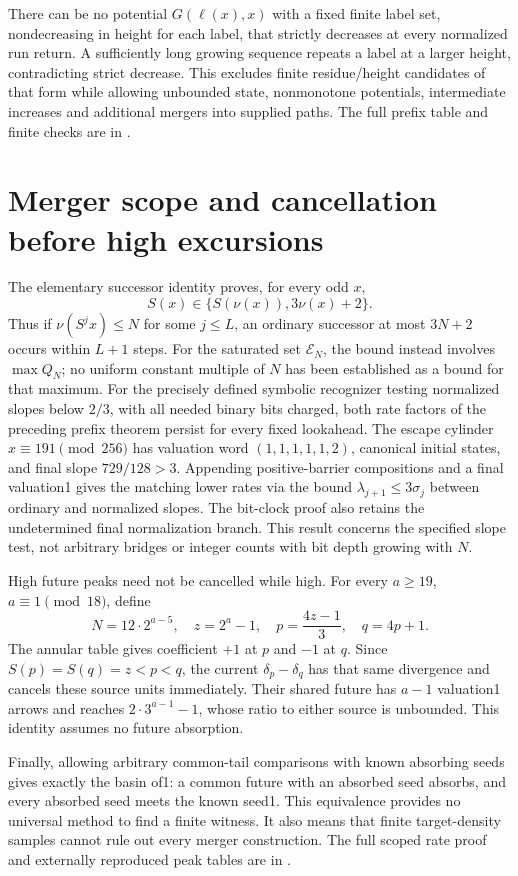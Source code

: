 \documentclass[11pt]{article}
\begin{document}
There can be no potential $G(\ell(x),x)$ with a fixed finite label set,
nondecreasing in height for each label, that strictly decreases at every
normalized run return. A sufficiently long growing sequence repeats a
label at a larger height, contradicting strict decrease. This excludes
finite residue/height candidates of that form while allowing unbounded
state, nonmonotone potentials, intermediate increases and additional
mergers into supplied paths. The full prefix table and finite checks are in
.

\section{Merger scope and cancellation before high excursions}
The elementary successor identity proves, for every odd $x$,
\[
S(x)\in\{S(\nu(x)),3\nu(x)+2\}.
\]
Thus if $\nu(S^j x)\le N$ for some $j\le L$, an ordinary successor
at most $3N+2$ occurs within $L+1$ steps. For the saturated set
$\mathcal E_N$, the bound instead involves $\max Q_N$; no uniform
constant multiple of $N$ has been established as a bound for that maximum.
For the precisely defined symbolic recognizer testing normalized slopes
below $2/3$, with all needed binary bits charged, both rate factors of
the preceding prefix theorem persist for every fixed lookahead.
The escape cylinder $x\equiv191\pmod{256}$ has valuation word
$(1,1,1,1,1,2)$, canonical initial states, and final slope $729/128>3$.
Appending positive-barrier compositions and a final valuation1 gives
the matching lower rates via the bound
$\lambda_{j+1}\le3\sigma_j$ between ordinary and normalized slopes.
The bit-clock proof also retains the undetermined final normalization
branch. This result concerns the specified slope test, not arbitrary
bridges or integer counts with bit depth growing with $N$.

High future peaks need not be cancelled while high. For every
$a\ge19$, $a\equiv1\pmod{18}$, define
\[
N=12\cdot2^{a-5},\quad z=2^a-1,\quad
p=\frac{4z-1}{3},\quad q=4p+1.
\]
The annular table gives coefficient $+1$ at $p$ and $-1$ at $q$.
Since $S(p)=S(q)=z<p<q$, the current $\delta_p-\delta_q$ has
that same divergence and cancels these source units immediately.
Their shared future has $a-1$ valuation1 arrows and reaches
$2\cdot3^{a-1}-1$, whose ratio to either source is unbounded.
This identity assumes no future absorption.

Finally, allowing arbitrary common-tail comparisons with known absorbing
seeds gives exactly the basin of1: a common future with an absorbed seed
absorbs, and every absorbed seed meets the known seed1. This equivalence
provides no universal method to find a finite witness. It also means that
finite target-density samples cannot rule out every merger construction.
The full scoped rate proof and externally reproduced peak tables are in
.
\end{document}
